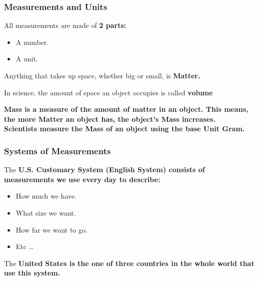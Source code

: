 
\subsubsection*{Measurements and Units}

All measurements are made of \bf{2} parts:

\begin{itemize}
	\item A number.
	\item A unit.
\end{itemize}

\begin{definition}[Matter]
	Anything that takes up space, whether big or small, is \bf{Matter}.
\end{definition}

\begin{definition}[Volume]
	In science, the amount of space an object occupies is called \bf{volume}
\end{definition}

\begin{definition}[Mass]
	\bf{Mass} is a measure of the amount of matter in an object. This means, the more \bf{Matter} an object has, the object's \bf{Mass} increases. \\
	Scientists measure the \bf{Mass} of an object using the base \bf{Unit Gram}.
\end{definition}

\subsubsection*{Systems of Measurements}

The \bf{U.S. Customary System (English System)} consists of measurements we use every day to describe:

\begin{itemize}
	\item How much we have.
	\item What size we want.
	\item How far we want to go.
	\item Etc \ldots
\end{itemize}

The \bf{United States} is the one of three countries in the \bf{whole world} that use this system.

